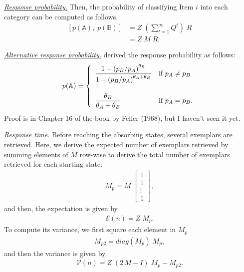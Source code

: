 \documentclass[doc]{apa6}
\newcommand{\subsubsubsection}[1]{\textit{\underline{#1}}}
\begin{document}
\subsubsubsection{Response probability.} Then, the probability of classifying Item $i$ into each
category can be computed as follows.
\begin{align}
    \left[p(\mathbb{A}),\; p(\mathbb{B})\right]
        &= Z \; \left( \sum_{t=1}^{\infty} Q^{t} \right) \; R\\
        &= Z \; M \; R.
\end{align}

\subsubsubsection{Alternative response probability.} \textcite{Nosofsky1997a} derived the
response probability as follows:
\begin{align}
    p(\mathbb{A}) = \left\{
            \begin{array}{ll}
            \displaystyle
                \frac{1 - {\left(p_{B}/p_{A}\right)}^{\theta_{B}}}
                     {1 - {\left(p_{B}/p_{A}\right)}^{\theta_{A} + \theta_{B}}}
                     & \mbox{if } p_{A} \neq p_{B} \\
            \vspace{2pt}\\
            \displaystyle
                \frac{\theta_{B}}{\theta_{A} + \theta_{B}}
                    & \mbox{if } p_{A} = p_{B}.
            \end{array}
           \right.
\end{align}
Proof is in Chapter 16 of the book by Feller (1968), but I haven't seen it yet.

\subsubsubsection{Response time.} Before reaching the absorbing states, several exemplars are
retrieved. Here, we derive the expected number of exemplars retrieved by summing elements of $M$
row-wise to derive the total number of exemplars retrieved for each starting state:
\begin{align}
    M_{p} = M \; \left[ \begin{array}{c} 1 \\ 1 \\ \vdots \\ 1 \end{array} \right],
\end{align}
and then, the expectation is given by
\begin{align}
    \mathcal{E}(n) = Z \; M_{p}.
\end{align}
To compute its variance, we first square each element in $M_{p}$
\begin{align}
    M_{p2} = diag{(M_{p})} \; M_{p},
\end{align}
and then the variance is given by
\begin{align}
    \mathcal{V}(n) = Z \; (2 \, M - I) \; M_{p} - M_{p2}.
\end{align}
\end{document}
